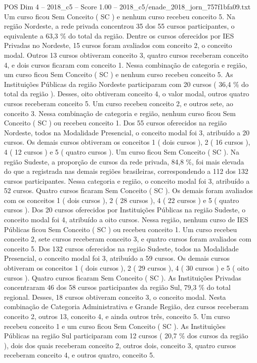 \begin{textsample}{POS Dim 4 – 2018\_c5 – Score 1.00 – 2018\_c5/enade\_2018\_jorn\_757f1bfa09.txt}
Um curso ficou Sem Conceito ( SC ) e nenhum curso recebeu conceito 5.
Na região Nordeste, a rede privada concentrou 35 dos 55 cursos participantes, o equivalente a 63,3 \% do total da região.
Dentre os cursos oferecidos por IES Privadas no Nordeste, 15 cursos foram avaliados com conceito 2, o conceito modal.
Outros 13 cursos obtiveram conceito 3, quatro cursos receberam conceito 4, e dois cursos ficaram com conceito 1.
Nessa combinação de categoria e região, um curso ficou Sem Conceito ( SC ) e nenhum curso recebeu conceito 5.
As Instituições Públicas da região Nordeste participaram com 20 cursos ( 36,4 \% do total da região ).
Desses, oito obtiveram conceito 4, o valor modal, outros quatro cursos receberam conceito 5.
Um curso recebeu conceito 2, e outros sete, ao conceito 3.
Nessa combinação de categoria e região, nenhum curso ficou Sem Conceito ( SC ) ou recebeu conceito 1.
Dos 55 cursos oferecidos na região Nordeste, todos na Modalidade Presencial, o conceito modal foi 3, atribuído a 20 cursos.
Os demais cursos obtiveram os conceitos 1 ( dois cursos ), 2 ( 16 cursos ), 4 ( 12 cursos ) e 5 ( quatro cursos ).
Um curso ficou Sem Conceito ( SC ).
Na região Sudeste, a proporção de cursos da rede privada, 84,8 \%, foi mais elevada do que a registrada nas demais regiões brasileiras, correspondendo a 112 dos 132 cursos participantes.
Nessa categoria e região, o conceito modal foi 3, atribuído a 52 cursos.
Quatro cursos ficaram Sem Conceito ( SC ).
Os demais foram avaliados com os conceitos 1 ( dois cursos ), 2 ( 28 cursos ), 4 ( 22 cursos ) e 5 ( quatro cursos ).
Dos 20 cursos oferecidos por Instituições Públicas na região Sudeste, o conceito modal foi 4, atribuído a oito cursos.
Nessa região, nenhum curso de IES Públicas ficou Sem Conceito ( SC ) ou recebeu conceito 1.
Um curso recebeu conceito 2, sete cursos receberam conceito 3, e quatro cursos foram avaliados com conceito 5.
Dos 132 cursos oferecidos na região Sudeste, todos na Modalidade Presencial, o conceito modal foi 3, atribuído a 59 cursos.
Os demais cursos obtiveram os conceitos 1 ( dois cursos ), 2 ( 29 cursos ), 4 ( 30 cursos ) e 5 ( oito cursos ).
Quatro cursos ficaram Sem Conceito ( SC ).
As Instituições Privadas concentraram 46 dos 58 cursos participantes da região Sul, 79,3 \% do total regional.
Desses, 18 cursos obtiveram conceito 3, o conceito modal.
Nesta combinação de Categoria Administrativa e Grande Região, dez cursos receberam conceito 2, outros 13, conceito 4, e ainda outros três, conceito 5.
Um curso recebeu conceito 1 e um curso ficou Sem Conceito ( SC ).
As Instituições Públicas na região Sul participaram com 12 cursos ( 20,7 \% dos cursos da região ), dois dos quais receberam conceito 2, outros dois, conceito 3, quatro cursos receberam conceito 4, e outros quatro, conceito 5.

\end{textsample}
